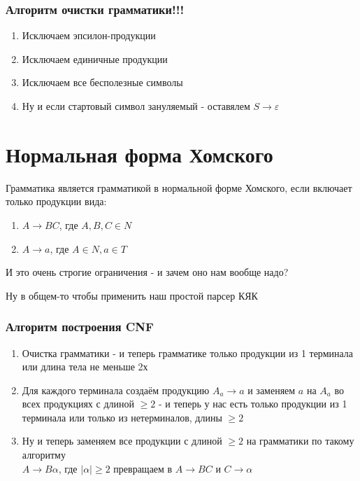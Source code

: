 \documentclass{article}
\begin{document}
\section{Алгоритм очистки грамматики!!!}
\begin{enumerate}
\item Исключаем эпсилон-продукции
\item Исключаем единичные продукции
\item Исключаем все бесполезные символы
\item Ну и если стартовый символ зануляемый - оставялем $S \to \varepsilon$

\end{enumerate}
\part{Нормальная форма Хомского}
Грамматика является грамматикой в нормальной форме Хомского, если включает только продукции вида:
\begin{enumerate}
\item $A \to BC$, где $A, B, C \in N$
\item $A \to a$, где $A \in N, a \in T$
\end{enumerate}

И это очень строгие ограничения - и зачем оно нам вообще надо?

Ну в общем-то чтобы применить наш простой парсер КЯК

\section{Алгоритм построения CNF}
\begin{enumerate}
  \item Очистка грамматики -  и теперь  грамматике только продукции из 1 терминала или длина тела не меньше 2х
    \item Для каждого терминала создаём продукцию $A_a \to a$ и заменяем $a$ на $A_a$ во всех продукциях с длиной $\ge 2$ - и теперь у нас есть только продукции из 1 терминала или только из нетерминалов, длины $\ge 2$
     \item Ну и теперь заменяем все продукции с длиной $\ge 2$ на грамматики по такому алгоритму\\
      $A \to B\alpha $, где $|\alpha| \ge 2$ превращаем в $A \to BC$ и $C \to \alpha$
\end{enumerate}
\end{document}
